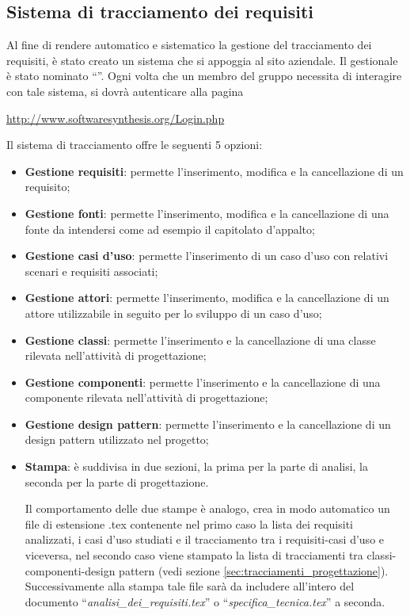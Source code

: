 \subsection{Sistema di tracciamento dei requisiti}
\label{sec:tracciamento}
Al fine di rendere automatico e sistematico la gestione del tracciamento dei requisiti, è stato creato un sistema che si appoggia al sito aziendale. Il gestionale è stato nominato ``\manager{}''. Ogni volta che un membro del gruppo necessita di interagire con tale sistema, si dovrà autenticare alla pagina

\begin{center}
\url{http://www.softwaresynthesis.org/Login.php}
\end{center}

Il sistema di tracciamento offre le seguenti 5 opzioni:
\begin{itemize}
\item \textbf{Gestione requisiti}: permette l'inserimento, modifica e la cancellazione di un requisito;
\item \textbf{Gestione fonti}: permette l'inserimento, modifica e la cancellazione di una fonte da intendersi come ad esempio il capitolato d'appalto;
\item \textbf{Gestione casi d'uso}: permette l'inserimento di un caso d'uso con relativi scenari  e requisiti associati;
\item \textbf{Gestione attori}: permette l'inserimento, modifica e la cancellazione di un attore utilizzabile in seguito per lo sviluppo di un caso d'uso;
\item \textbf{Gestione classi}: permette l'inserimento e la cancellazione di una classe rilevata nell'attività di progettazione;
\item \textbf{Gestione componenti}: permette l'inserimento e la cancellazione di una componente rilevata nell'attività di progettazione;
\item \textbf{Gestione design pattern}: permette l'inserimento e la cancellazione di un design pattern utilizzato nel progetto;

\item \textbf{Stampa}: è suddivisa in due sezioni, la prima per la parte di analisi, la seconda per la parte di progettazione.

Il comportamento delle due stampe è analogo, crea in modo automatico un file di estensione .tex contenente nel primo caso la lista dei requisiti analizzati, i casi d'uso studiati e il tracciamento tra i requisiti-casi d'uso e viceversa, nel secondo caso viene stampato la lista di tracciamenti tra classi-componenti-design pattern (vedi sezione \ref{sec:tracciamenti_progettazione}). Successivamente alla stampa tale file sarà da includere all'intero del documento ``\textit{analisi\_dei\_requisiti.tex}'' o ``\textit{specifica\_tecnica.tex}'' a seconda.
\end{itemize}

